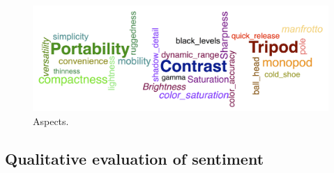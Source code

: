 \documentclass{article} %
\begin{document}






\begin{figure}[ht]
\begin{center}
\includegraphics[width=.85\columnwidth]{Aspects_long.png}
\end{center}
\caption{Aspects.}
\label{aspectFig}
\end{figure}


\subsection{Qualitative evaluation of sentiment}
\end{document}
